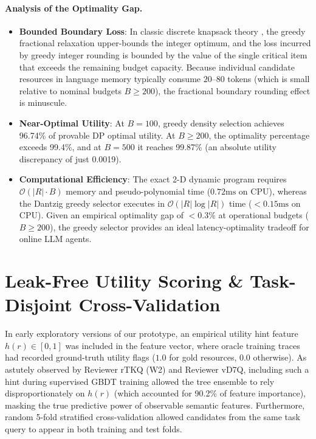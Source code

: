 \documentclass{article}
\begin{document}
\paragraph{Analysis of the Optimality Gap.}
\begin{itemize}
    \item \textbf{Bounded Boundary Loss}: In classic discrete knapsack theory \citep{dantzig1957discrete, martello1990knapsack}, the greedy fractional relaxation upper-bounds the integer optimum, and the loss incurred by greedy integer rounding is bounded by the value of the single critical item that exceeds the remaining budget capacity. Because individual candidate resources in language memory typically consume $20$--$80$ tokens (which is small relative to nominal budgets $B \ge 200$), the fractional boundary rounding effect is minuscule.
    \item \textbf{Near-Optimal Utility}: At $B=100$, greedy density selection achieves 96.74\% of provable DP optimal utility. At $B \ge 200$, the optimality percentage exceeds 99.4\%, and at $B=500$ it reaches 99.87\% (an absolute utility discrepancy of just 0.0019).
    \item \textbf{Computational Efficiency}: The exact 2-D dynamic program requires $\mathcal{O}(|R| \cdot B)$ memory and pseudo-polynomial time ($0.72\text{ms}$ on CPU), whereas the Dantzig greedy selector executes in $\mathcal{O}(|R| \log |R|)$ time ($<0.15\text{ms}$ on CPU). Given an empirical optimality gap of $<0.3\%$ at operational budgets ($B \ge 200$), the greedy selector provides an ideal latency-optimality tradeoff for online LLM agents.
\end{itemize}

\section{Leak-Free Utility Scoring \& Task-Disjoint Cross-Validation}
\label{app:deleakage}

In early exploratory versions of our prototype, an empirical utility hint feature $h(r) \in [0, 1]$ was included in the feature vector, where oracle training traces had recorded ground-truth utility flags ($1.0$ for gold resources, $0.0$ otherwise). As astutely observed by Reviewer rTKQ (W2) and Reviewer vD7Q, including such a hint during supervised GBDT training allowed the tree ensemble to rely disproportionately on $h(r)$ (which accounted for 90.2\% of feature importance), masking the true predictive power of observable semantic features. Furthermore, random 5-fold stratified cross-validation allowed candidates from the same task query to appear in both training and test folds.
\end{document}
